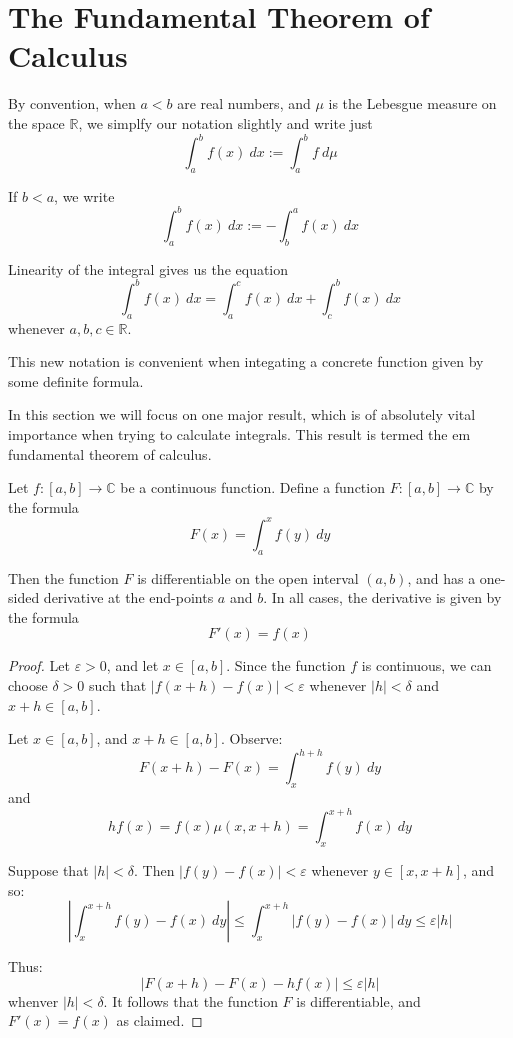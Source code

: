 \section{The Fundamental Theorem of Calculus}

By convention, when $a<b$ are real numbers, and $\mu$ is the Lebesgue measure on the space $\mathbb R$, we simplfy our notation slightly and write just
$$\int_a^b f(x)\ dx := \int_a^b f\ d\mu$$

If $b<a$, we write
$$\int_a^b f(x)\ dx := - \int_b^a f(x)\ dx$$

Linearity of the integral gives us the equation
$$\int_a^b f(x)\ dx = \int_a^c f(x)\ dx + \int_c^b f(x)\ dx$$
whenever $a,b,c\in {\mathbb R}$.

This new notation is convenient when integating a concrete function given by some definite formula.

In this section we will focus on one major result, which is of absolutely vital importance when trying to calculate integrals.  This result is termed the {em fundamental theorem of calculus}.

\begin{theorem}
Let $f\colon [a,b] \rightarrow {\mathbb C}$ be a continuous function.  Define a function $F\colon [a,b]\rightarrow {\mathbb C}$ by the formula
$$F(x) = \int_a^x f(y)\ dy$$

Then the function $F$ is differentiable on the open interval $(a,b)$, and has a one-sided derivative at the end-points $a$ and $b$.  In all cases, the derivative is given by the formula
$$F'(x) = f(x)$$
\end{theorem}

\begin{proof}
Let $\varepsilon >0$, and let $x\in [a,b]$.  Since the function $f$ is continuous, we can choose $\delta >0$ such that $|f(x+h) -f(x)| <\varepsilon$ whenever $|h|<\delta$ and $x+h\in [a,b]$.  

Let $x\in [a,b]$, and $x+h\in [a,b]$.  Observe:
$$F(x+h)- F(x)= \int_x^{h+h} f(y)\ dy$$
and
$$hf(x) = f(x)\mu (x,x+h) = \int_x^{x+h} f(x)\ dy$$

Suppose that $|h|<\delta$.  Then $|f(y)-f(x)| < \varepsilon$ whenever $y\in [x,x+h]$, and so:
$$\left| \int_x^{x+h} f(y)-f(x)\ dy \right| \leq \int_x^{x+h} |f(y) -f(x)|\ dy \leq \varepsilon |h|$$

Thus:
$$|F(x+h) -F(x) - hf(x)| \leq \varepsilon |h|$$
whenver $|h|<\delta$.  It follows that the function $F$ is differentiable, and $F'(x) =f(x)$ as claimed.
\end{proof}

